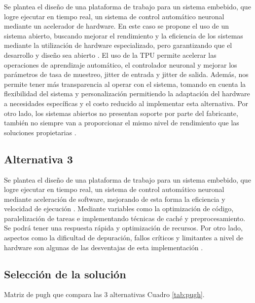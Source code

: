 \documentclass[12pt]{article}
\begin{document}
Se plantea el diseño de una plataforma de trabajo para un sistema embebido, que logre ejecutar en tiempo real, un sistema de control automático neuronal mediante un acelerador de hardware. En este caso se propone el uso de un sistema abierto, buscando mejorar el rendimiento y la eficiencia de los sistemas mediante la utilización de hardware especializado, pero garantizando que el desarrollo y diseño sea abierto \cite{scarpino2011opencl} \cite{owaida2011massively}. El uso de la TPU permite acelerar las operaciones de aprendizaje automático, el controlador neuronal y mejorar los parámetros de tasa de muestreo, jitter de entrada y jitter de salida. Además, nos permite tener más transparencia al operar con el sistema, tomando en cuenta la flexibilidad del sistema y personalización permitiendo la adaptación del hardware a necesidades específicas y el costo reducido al implementar esta alternativa. Por otro lado, los sistemas abiertos no presentan soporte por parte del fabricante, también no siempre van a proporcionar el mismo nivel de rendimiento que las soluciones propietarias \cite{meyer2020evaluating} \cite{verma2016accelerating}.

\subsection{Alternativa 3}
Se plantea el diseño de una plataforma de trabajo para un sistema embebido, que logre ejecutar en tiempo real, un sistema de control automático neuronal mediante aceleración de software, mejorando de esta forma la eficiencia y velocidad de ejecución \cite{galan2000control}. Mediante variables como la optimización de código, paralelización de tareas e implementando técnicas de caché y preprocesamiento. Se podrá tener una respuesta rápida y optimización de recursos. Por otro lado, aspectos como la dificultad de depuración, fallos críticos y limitantes a nivel de hardware son algunas de las desventajas de esta implementación \cite{kim1994software} \cite{razdan1994prisc}.


\subsection{Selección de la solución}

Matriz de pugh que compara las 3 alternativas Cuadro \ref{tab:pugh}.
\end{document}

